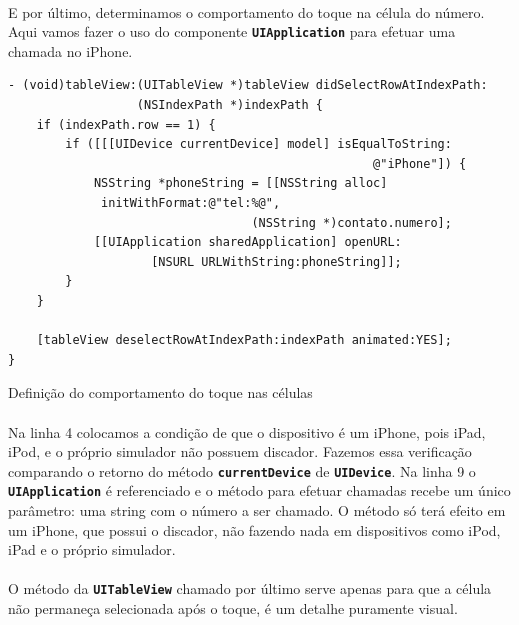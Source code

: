\documentclass[a4paper,12pt,brazil,doubleside]{book}
\begin{document}
\begin{singlespace}
\paragraph{}E por último, determinamos o comportamento do toque na célula do número. Aqui vamos fazer o uso do componente \texttt{\textbf{UIApplication}} para efetuar uma chamada no iPhone.

\begin{listing}[H]
\begin{verbatim}
- (void)tableView:(UITableView *)tableView didSelectRowAtIndexPath:
                  (NSIndexPath *)indexPath {
    if (indexPath.row == 1) {
        if ([[[UIDevice currentDevice] model] isEqualToString:
                                                   @"iPhone"]) {
            NSString *phoneString = [[NSString alloc] 
             initWithFormat:@"tel:%@",
                                  (NSString *)contato.numero];
            [[UIApplication sharedApplication] openURL:
                    [NSURL URLWithString:phoneString]];
        }
    }
    
    [tableView deselectRowAtIndexPath:indexPath animated:YES];
}
\end{verbatim}
\caption{Definição do comportamento do toque nas células}
\end{listing}

\paragraph{}Na linha 4 colocamos a condição de que o dispositivo é um iPhone, pois iPad, iPod, e o próprio simulador não possuem discador. Fazemos essa verificação comparando o retorno do método \texttt{\textbf{currentDevice}} de \texttt{\textbf{UIDevice}}. Na linha 9 o \texttt{\textbf{UIApplication}} é referenciado e o método para efetuar chamadas recebe um único parâmetro: uma string com o número a ser chamado. O método só terá efeito em um iPhone, que possui o discador, não fazendo nada em dispositivos como iPod, iPad e o próprio simulador.
\paragraph{}O método da \texttt{\textbf{UITableView}} chamado por último serve apenas para que a célula não permaneça selecionada após o toque, é um detalhe puramente visual.

\bigskip
\bigskip


\end{singlespace}
\end{document}
